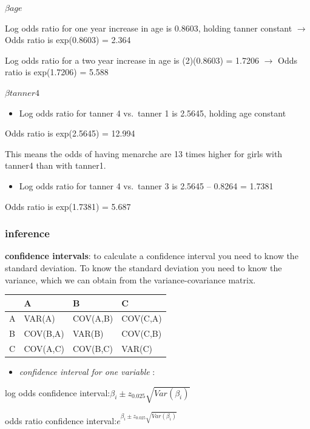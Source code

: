 \documentclass[
]{article}
\providecommand{\tightlist}{%
  \setlength{\itemsep}{0pt}\setlength{\parskip}{0pt}}
\begin{document}
\(\beta age\)

Log odds ratio for one year increase in age is 0.8603, holding tanner
constant \(\to\) Odds ratio is exp(0.8603) = 2.364

Log odds ratio for a two year increase in age is (2)(0.8603) = 1.7206
\(\to\) Odds ratio is exp(1.7206) = 5.588

\(\beta tanner4\)

\begin{itemize}
\tightlist
\item
  Log odds ratio for tanner 4 vs.~tanner 1 is 2.5645, holding age
  constant
\end{itemize}

Odds ratio is exp(2.5645) = 12.994

This means the odds of having menarche are 13 times higher for girls
with tanner4 than with tanner1.

\begin{itemize}
\tightlist
\item
  Log odds ratio for tanner 4 vs.~tanner 3 is 2.5645 -- 0.8264 = 1.7381
\end{itemize}

Odds ratio is exp(1.7381) = 5.687

\hypertarget{inference-1}{%
\subsubsection{inference}\label{inference-1}}

\textbf{confidence intervals}: to calculate a confidence interval you
need to know the standard deviation. To know the standard deviation you
need to know the variance, which we can obtain from the
variance-covariance matrix.

\begin{longtable}[]{@{}llll@{}}
\toprule
& A & B & C\tabularnewline
\midrule
\endhead
A & VAR(A) & COV(A,B) & COV(C,A)\tabularnewline
B & COV(B,A) & VAR(B) & COV(C,B)\tabularnewline
C & COV(A,C) & COV(B,C) & VAR(C)\tabularnewline
\bottomrule
\end{longtable}

\begin{itemize}
\tightlist
\item
  \emph{confidence interval for one variable} :
\end{itemize}

log odds confidence
interval:\(\beta_i \pm z_{0.025} \sqrt{Var(\beta_i)}\)

odds ratio confidence
interval:\(e^{\beta_i \pm z_{0.025} \sqrt{Var(\beta_i)}}\)
\end{document}
